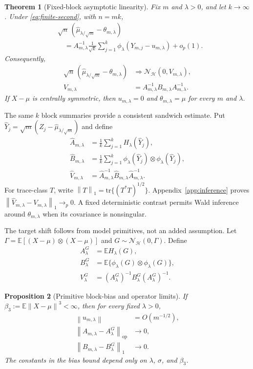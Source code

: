 \documentclass[twoside]{article}
\newtheorem{theorem}{Theorem}
\newtheorem{proposition}[theorem]{Proposition}
\theoremstyle{definition}
\newcommand{\Hcal}{\mathcal H}
\newcommand{\E}{\mathbb E}
\newcommand{\norm}[1]{\left\lVert #1\right\rVert}
\newcommand{\tr}{\mathrm{tr}}
\newcommand{\op}{\mathrm{op}}
\begin{document}
\begin{theorem}[Fixed-block asymptotic linearity]\label{thm:fixed-m-inference}
Fix $m$ and $\lambda>0$, and let $k\to\infty$. Under \eqref{eq:finite-second}, with $n=mk$,
\begin{align*}
    &\sqrt n\,(\hat\mu_{\lambda/\sqrt m}-\theta_{m,\lambda})\\
    &\quad=A_{m,\lambda}^{-1}\frac1{\sqrt k}
      \sum_{j=1}^k\phi_\lambda(Y_{m,j}-u_{m,\lambda})+o_p(1).
\end{align*}
Consequently,
\begin{align*}
    \sqrt n\,(\hat\mu_{\lambda/\sqrt m}-\theta_{m,\lambda})
    &\Rightarrow \mathcal N_{\Hcal}(0,V_{m,\lambda}),\\[-2mm]
    V_{m,\lambda}
    &=A_{m,\lambda}^{-1}B_{m,\lambda}A_{m,\lambda}^{-1}.
\end{align*}
If $X-\mu$ is centrally symmetric, then $u_{m,\lambda}=0$ and $\theta_{m,\lambda}=\mu$ for every $m$ and $\lambda$.
\end{theorem}

The same $k$ block summaries provide a consistent sandwich estimate. Put $\hat Y_j=\sqrt m(Z_j-\hat\mu_{\lambda/\sqrt m})$ and define
\begin{align*}
    \hat A_{m,\lambda}
    &=\frac1k\sum_{j=1}^kH_\lambda(\hat Y_j),\\
    \hat B_{m,\lambda}
    &=\frac1k\sum_{j=1}^k
      \phi_\lambda(\hat Y_j)\otimes\phi_\lambda(\hat Y_j),\\
    \hat V_{m,\lambda}
    &=\hat A_{m,\lambda}^{-1}\hat B_{m,\lambda}\hat A_{m,\lambda}^{-1}.
\end{align*}
For trace-class $T$, write $\norm{T}_1=\tr\{(T^*T)^{1/2}\}$. Appendix~\ref{app:inference} proves $\norm{\hat V_{m,\lambda}-V_{m,\lambda}}_1\to_p0$. A fixed deterministic contrast permits Wald inference around $\theta_{m,\lambda}$ when its covariance is nonsingular.

The target shift follows from model primitives, not an added assumption. Let $\Gamma=\E[(X-\mu)\otimes(X-\mu)]$ and $G\sim\mathcal N_{\Hcal}(0,\Gamma)$. Define
\begin{align*}
    A_\lambda^{G}&=\E H_\lambda(G),\\
    B_\lambda^{G}&=\E\{\phi_\lambda(G)\otimes\phi_\lambda(G)\},\\
    V_\lambda^{G}&=(A_\lambda^{G})^{-1}B_\lambda^{G}(A_\lambda^{G})^{-1}.
\end{align*}

\begin{proposition}[Primitive block-bias and operator limits]\label{prop:primitive-bias}
If $\beta_3:=\E\norm{X-\mu}^3<\infty$, then for every fixed $\lambda>0$,
\begin{align*}
    \norm{u_{m,\lambda}}&=O(m^{-1/2}),\\
    \norm{A_{m,\lambda}-A_\lambda^{G}}_{\op}&\to0,\\
    \norm{B_{m,\lambda}-B_\lambda^{G}}_1&\to0.
\end{align*}
The constants in the bias bound depend only on $\lambda$, $\sigma$, and $\beta_3$.
\end{proposition}
\end{document}
